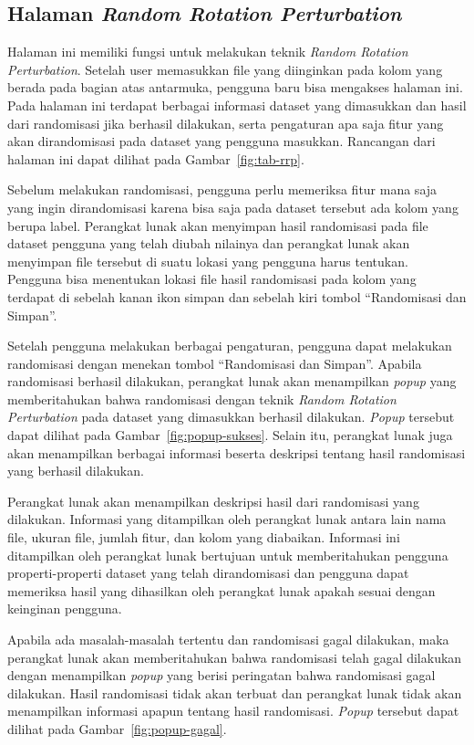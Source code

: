 \subsection{Halaman \textit{Random Rotation Perturbation}}
\label{subsec:tabrrp}

Halaman ini memiliki fungsi untuk melakukan teknik \textit{Random Rotation Perturbation}. Setelah user memasukkan file yang diinginkan pada kolom yang berada pada bagian atas antarmuka, pengguna baru bisa mengakses halaman ini. Pada halaman ini terdapat berbagai informasi dataset yang dimasukkan dan hasil dari randomisasi jika berhasil dilakukan, serta pengaturan apa saja fitur yang akan dirandomisasi pada dataset yang pengguna masukkan. Rancangan dari halaman ini dapat dilihat pada Gambar~\ref{fig:tab-rrp}.

Sebelum melakukan randomisasi, pengguna perlu memeriksa fitur mana saja yang ingin dirandomisasi karena bisa saja pada dataset tersebut ada kolom yang berupa label. Perangkat lunak akan menyimpan hasil randomisasi pada file dataset pengguna yang telah diubah nilainya dan perangkat lunak akan menyimpan file tersebut di suatu lokasi yang pengguna harus tentukan. Pengguna bisa menentukan lokasi file hasil randomisasi pada kolom yang terdapat di sebelah kanan ikon simpan dan sebelah kiri tombol \textquotedblleft Randomisasi dan Simpan\textquotedblright.

Setelah pengguna melakukan berbagai pengaturan, pengguna dapat melakukan randomisasi dengan menekan tombol \textquotedblleft Randomisasi dan Simpan\textquotedblright. Apabila randomisasi berhasil dilakukan, perangkat lunak akan menampilkan \textit{popup} yang memberitahukan bahwa randomisasi dengan teknik \textit{Random Rotation Perturbation} pada dataset yang dimasukkan berhasil dilakukan. \textit{Popup} tersebut dapat dilihat pada Gambar~\ref{fig:popup-sukses}. Selain itu, perangkat lunak juga akan menampilkan berbagai informasi beserta deskripsi tentang hasil randomisasi yang berhasil dilakukan.

Perangkat lunak akan menampilkan deskripsi hasil dari randomisasi yang dilakukan. Informasi yang ditampilkan oleh perangkat lunak antara lain nama file, ukuran file, jumlah fitur, dan kolom yang diabaikan. Informasi ini ditampilkan oleh perangkat lunak bertujuan untuk memberitahukan pengguna properti-properti dataset yang telah dirandomisasi dan pengguna dapat memeriksa hasil yang dihasilkan oleh perangkat lunak apakah sesuai dengan keinginan pengguna.

Apabila ada masalah-masalah tertentu dan randomisasi gagal dilakukan, maka perangkat lunak akan memberitahukan bahwa randomisasi telah gagal dilakukan dengan menampilkan \textit{popup} yang berisi peringatan bahwa randomisasi gagal dilakukan. Hasil randomisasi tidak akan terbuat dan perangkat lunak tidak akan menampilkan informasi apapun tentang hasil randomisasi. \textit{Popup} tersebut dapat dilihat pada Gambar~\ref{fig:popup-gagal}.

